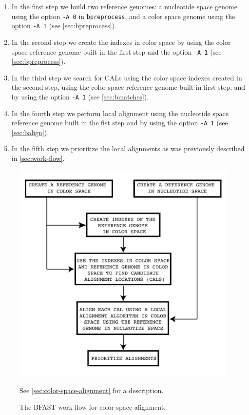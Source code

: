 \documentclass[a4paper,12pt]{book}
\newcommand{\TT}[1]{{\tt #1}} %
\begin{document}
\begin{enumerate}
	\item In the first step we build two reference genomes: a nucleotide space genome using the option \TT{-A 0} in \TT{bpreprocess}, and a color space genome using the option \TT{-A 1} (see \autoref{sec:bpreprocess}).
	\item In the second step we create the indexes in color space by using the color space reference genome built in the first step and the option \TT{-A 1} (see \autoref{sec:bpreprocess}).
	\item In the third step we search for CALs using the color space indexes created in the second step, using the color space reference genome built in first step, and by using the option \TT{-A 1} (see \autoref{sec:bmatches}).
	\item In the fourth step we perform local alignment using the nucleotide space reference genome built in the fist step and by using the option \TT{-A 1} (see \autoref{sec:balign}).
	\item In the fifth step we prioritize the local alignments as was previously described in \autoref{sec:work-flow}.
\end{enumerate}

\begin{figure}[t]
	\centering
	\includegraphics[scale=0.75]{work-flow-color.pdf}
	\caption{
	The BFAST work flow for color space alignment.
	}{
	See \autoref{sec:color-space-alignment} for a description.
	\label{fig:work-flow-color}
	}
\end{figure}
\end{document}
